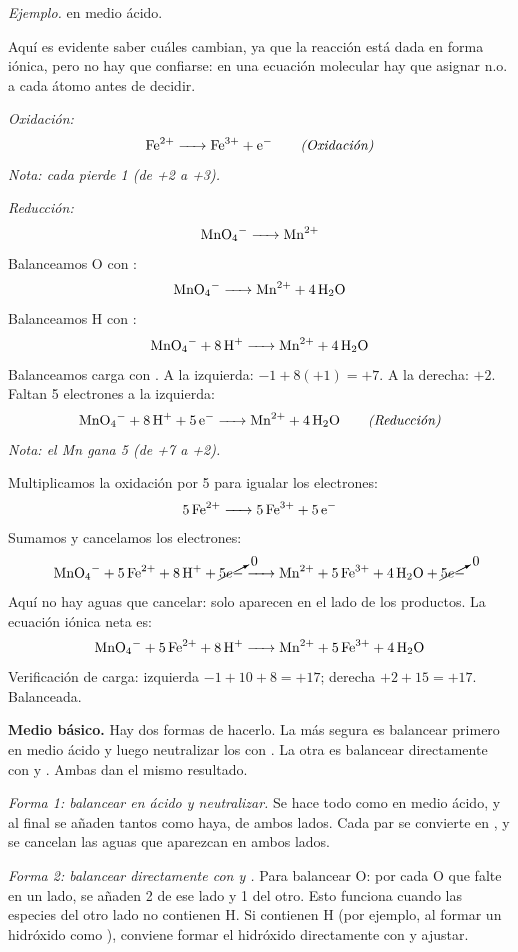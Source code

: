 \textit{Ejemplo.}  en
medio ácido.

Aquí es evidente saber cuáles cambian, ya que la reacción está
dada en forma iónica, pero no hay que confiarse: en una ecuación
molecular hay que asignar n.o. a cada átomo antes de decidir.

\textit{Oxidación:}
\begin{equation*}
\ce{Fe^{2+} -> Fe^{3+} + e-} \tag*{\textit{(Oxidación)}}
\end{equation*}
\textit{Nota: cada  pierde 1  (de +2 a +3).}

\textit{Reducción:}
\[
\ce{MnO4- -> Mn^{2+}}
\]
Balanceamos O con :
\[
\ce{MnO4- -> Mn^{2+} + 4H2O}
\]
Balanceamos H con :
\[
\ce{MnO4- + 8H+ -> Mn^{2+} + 4H2O}
\]
Balanceamos carga con . A la izquierda:
$-1 + 8(+1) = +7$. A la derecha: $+2$. Faltan 5 electrones a la
izquierda:
\begin{equation*}
\ce{MnO4- + 8H+ + 5e- -> Mn^{2+} + 4H2O} \tag*{\textit{(Reducción)}}
\end{equation*}
\textit{Nota: el Mn gana 5  (de +7 a +2).}

Multiplicamos la oxidación por 5 para igualar los electrones:
\[
\ce{5Fe^{2+} -> 5Fe^{3+} + 5e-}
\]
Sumamos y cancelamos los electrones:
\[
\ce{
MnO4- + 5Fe^{2+} + 8H+ + \cancelto{0}{5e-}
-> Mn^{2+} + 5Fe^{3+} + 4H2O + \cancelto{0}{5e-}
}
\]
Aquí no hay aguas que cancelar: solo aparecen en el lado de los
productos. La ecuación iónica neta es:
\[
\ce{MnO4- + 5Fe^{2+} + 8H+ -> Mn^{2+} + 5Fe^{3+} + 4H2O}
\]
Verificación de carga: izquierda $-1 + 10 + 8 = +17$; derecha
$+2 + 15 = +17$. Balanceada.

\medskip
\textbf{Medio básico.} Hay dos formas de hacerlo. La más segura
es balancear primero en medio ácido y luego neutralizar los
 con . La otra es balancear directamente con
 y . Ambas dan el mismo resultado.

\textit{Forma 1: balancear en ácido y neutralizar.} Se hace todo
como en medio ácido, y al final se añaden tantos  como
 haya, de ambos lados. Cada par  se convierte
en , y se cancelan las aguas que aparezcan en ambos
lados.

\textit{Forma 2: balancear directamente con  y .}
Para balancear O: por cada O que falte en un lado, se añaden
2  de ese lado y 1  del otro. Esto funciona
cuando las especies del otro lado no contienen H. Si contienen H
(por ejemplo, al formar un hidróxido como ), conviene
formar el hidróxido directamente con  y ajustar.

